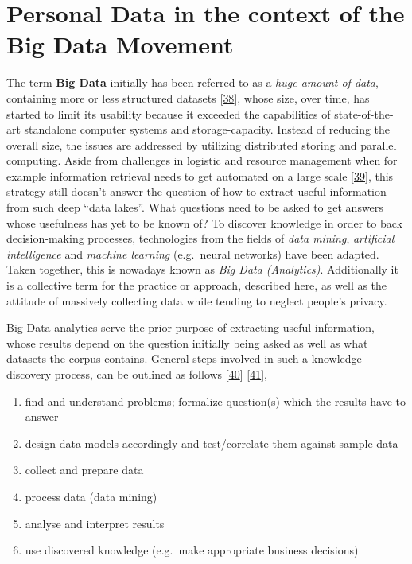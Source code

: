 \documentclass[12pt,english,a4paper,titlepage,cleardoublepage=empty,dottedtoc]{report}
\providecommand{\tightlist}{%
  \setlength{\itemsep}{0pt}\setlength{\parskip}{0pt}}
\begin{document}
\section{Personal Data in the context of the Big Data
Movement}\label{personal-data-in-the-context-of-the-big-data-movement}

The term \textbf{\protect\hypertarget{def--big-data}{}{Big Data}}
initially has been referred to as a \emph{huge amount of data},
containing more or less structured datasets
{[}\protect\hyperlink{ref-web_2016_oxford_definition_big-data}{38}{]},
whose size, over time, has started to limit its usability because it
exceeded the capabilities of state-of-the-art standalone computer
systems and storage-capacity. Instead of reducing the overall size, the
issues are addressed by utilizing distributed storing and parallel
computing. Aside from challenges in logistic and resource management
when for example information retrieval needs to get automated on a large
scale
{[}\protect\hyperlink{ref-web_2016_wikipedia_definition_big-data}{39}{]},
this strategy still doesn't answer the question of how to extract useful
information from such deep ``data lakes''. What questions need to be
asked to get answers whose usefulness has yet to be known of? To
discover knowledge in order to back decision-making processes,
technologies from the fields of \emph{data mining}, \emph{artificial
intelligence} and \emph{machine learning} (e.g.~neural networks) have
been adapted. Taken together, this is nowadays known as \emph{Big Data
(Analytics)}. Additionally it is a collective term for the practice or
approach, described here, as well as the attitude of massively
collecting data while tending to neglect people's privacy.

Big Data analytics serve the prior purpose of extracting useful
information, whose results depend on the question initially being asked
as well as what datasets the corpus contains. General steps involved in
such a knowledge discovery process, can be outlined as follows
{[}\protect\hyperlink{ref-chapter_2007_the-knowledge-discovery-process}{40}{]}
{[}\protect\hyperlink{ref-paper_2009_a-data-mining-knowledge-discovery-process-model}{41}{]},

\begin{enumerate}
\def\labelenumi{\arabic{enumi}.}
\tightlist
\item
  find and understand problems; formalize question(s) which the results
  have to answer
\item
  design data models accordingly and test/correlate them against sample
  data
\item
  collect and prepare data
\item
  process data (data mining)
\item
  analyse and interpret results
\item
  use discovered knowledge (e.g.~make appropriate business decisions)
\end{enumerate}
\end{document}
